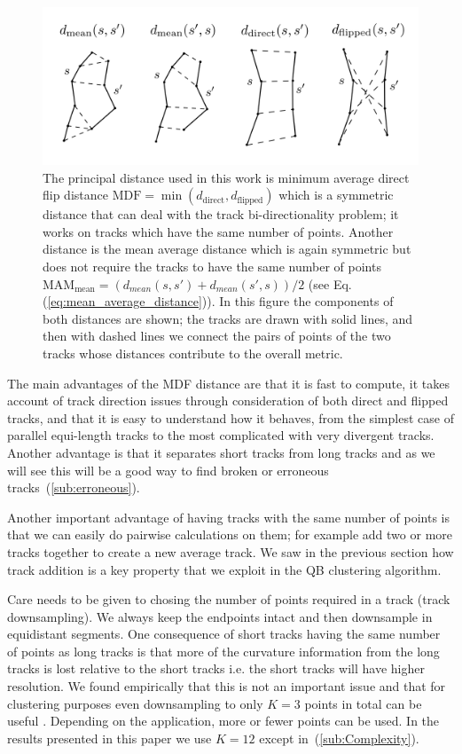 \documentclass[preprint,authoryear,a4paper,10pt,onecolumn]{elsarticle}
\begin{document}
\begin{figure}
\includegraphics[scale=0.5]{distances2}
\centering{}\caption{The principal distance used in this work is minimum
  average direct flip distance
  $\textrm{MDF}=\min(d_{\textrm{direct}},d_{\textrm{flipped}})$ which is
  a symmetric distance that can deal with the track bi-directionality
  problem; it works on tracks which have the same number of points.
  Another distance is the mean average distance which is again symmetric
  but does not require the tracks to have the same number of points
  $\textrm{MAM}_{\textrm{mean}}=(d_{mean}(s,s')+d_{mean}(s',s))/2$ (see
  Eq. (\ref{eq:mean_average_distance})).  In this figure the components
  of both distances are shown; the tracks are drawn with solid lines,
  and then with dashed lines we connect the pairs of points of the two
  tracks whose distances contribute to the overall
  metric.\label{Flo:Distances_used}}
\end{figure}

The main advantages of the MDF distance are that it is fast to compute,
it takes account of track direction issues through consideration of both
direct and flipped tracks, and that it is easy to understand how it
behaves, from the simplest case of parallel equi-length tracks to the
most complicated with very divergent tracks. Another advantage is that
it separates short tracks from long tracks and as we will see this will
be a good way to find broken or erroneous
tracks~(\ref{sub:erroneous}). 

Another important advantage of having tracks with the same number of
points is that we can easily do pairwise calculations on them; for
example add two or more tracks together to create a new average
track. We saw in the previous section how track addition is a key
property that we exploit in the QB clustering algorithm.

Care needs to be given to chosing the number of points required in a
track (track downsampling). We always keep the endpoints intact and then
downsample in equidistant segments. One consequence of short tracks
having the same number of points as long tracks is that more of the
curvature information from the long tracks is lost relative to the short
tracks i.e. the short tracks will have higher resolution.  We found
empirically that this is not an important issue and that for clustering
purposes even downsampling to only $K=3$ points in total can be useful
\citep{EGMB10}. Depending on the application, more or fewer points can
be used. In the results presented in this paper we use $K=12$ except
in~(\ref{sub:Complexity}).
\end{document}
